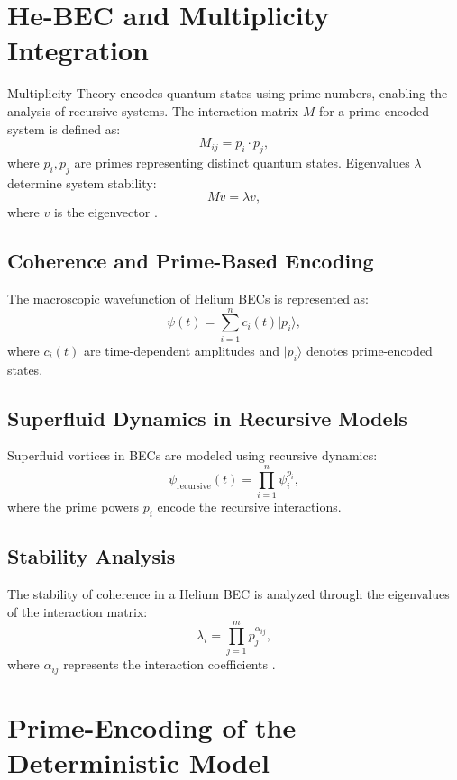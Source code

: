 \documentclass{article}
\theoremstyle{plain}
\begin{document}
\section{He-BEC and Multiplicity Integration}
Multiplicity Theory encodes quantum states using prime numbers, enabling the analysis of recursive systems. The interaction matrix $M$ for a prime-encoded system is defined as:
\begin{equation}
M_{ij} = p_i \cdot p_j,
\end{equation}
where $p_i, p_j$ are primes representing distinct quantum states. Eigenvalues $\lambda$ determine system stability:
\begin{equation}
M v = \lambda v,
\end{equation}
where $v$ is the eigenvector \cite{multiplicity2024}.
\subsection{Coherence and Prime-Based Encoding}
The macroscopic wavefunction of Helium BECs is represented as:
\begin{equation}
\psi(t) = \sum_{i=1}^n c_i(t) |p_i\rangle,
\end{equation}
where $c_i(t)$ are time-dependent amplitudes and $|p_i\rangle$ denotes prime-encoded states.

\subsection{Superfluid Dynamics in Recursive Models}
Superfluid vortices in BECs are modeled using recursive dynamics:
\begin{equation}
\psi_{\text{recursive}}(t) = \prod_{i=1}^n \psi^{p_i}_i,
\end{equation}
where the prime powers $p_i$ encode the recursive interactions.

\subsection{Stability Analysis}
The stability of coherence in a Helium BEC is analyzed through the eigenvalues of the interaction matrix:
\begin{equation}
\lambda_i = \prod_{j=1}^m p_j^{\alpha_{ij}},
\end{equation}
where $\alpha_{ij}$ represents the interaction coefficients \cite{pethick2008}.

\section{Prime-Encoding of the Deterministic Model}
\end{document}

